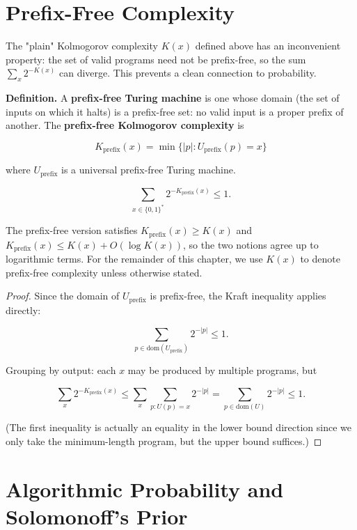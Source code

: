 \section{Prefix-Free Complexity}

The "plain" Kolmogorov complexity $K(x)$ defined above has an inconvenient property: the set of valid programs need not be prefix-free, so the sum $\sum_x 2^{-K(x)}$ can diverge. This prevents a clean connection to probability.

\textbf{Definition.} A \textbf{prefix-free Turing machine} is one whose domain (the set of inputs on which it halts) is a prefix-free set: no valid input is a proper prefix of another. The \textbf{prefix-free Kolmogorov complexity} is

\[K_{\text{prefix}}(x) = \min\{ |p| : U_{\text{prefix}}(p) = x\} \]

where $U_{\text{prefix}}$ is a universal prefix-free Turing machine.

\begin{theorem}

\[\sum_{x \in \{ 0,1\} ^*} 2^{-K_{\text{prefix}}(x)} \leq 1.\]


The prefix-free version satisfies $K_{\text{prefix}}(x) \geq K(x)$ and $K_{\text{prefix}}(x) \leq K(x) + O(\log K(x))$, so the two notions agree up to logarithmic terms. For the remainder of this chapter, we use $K(x)$ to denote prefix-free complexity unless otherwise stated.



\end{theorem}

\begin{proof}
Since the domain of $U_{\text{prefix}}$ is prefix-free, the Kraft inequality applies directly:

\[\sum_{p \in \text{dom}(U_{\text{prefix}})} 2^{-|p|} \leq 1.\]

Grouping by output: each $x$ may be produced by multiple programs, but

\[\sum_x 2^{-K_{\text{prefix}}(x)} \leq \sum_x \sum_{p: U(p) = x} 2^{-|p|} = \sum_{p \in \text{dom}(U)} 2^{-|p|} \leq 1.\]

(The first inequality is actually an equality in the lower bound direction since we only take the minimum-length program, but the upper bound suffices.) 
\end{proof}

\section{Algorithmic Probability and Solomonoff's Prior}

